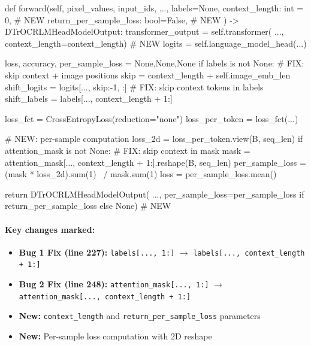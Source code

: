 \documentclass[11pt, a4paper]{report}
\begin{document}
\begin{minipage}[t]{0.48\textwidth}
\begin{newcode}
def forward(self, pixel_values, input_ids,
    ..., labels=None,
    context_length: int = 0,           # NEW
    return_per_sample_loss: bool=False, # NEW
) -> DTrOCRLMHeadModelOutput:
    transformer_output = self.transformer(
      ..., context_length=context_length) # NEW
    logits = self.language_model_head(...)

    loss, accuracy, per_sample_loss = None,None,None
    if labels is not None:
      # FIX: skip context + image positions
      skip = context_length + self.image_emb_len
      shift_logits = logits[..., skip:-1, :]
      # FIX: skip context tokens in labels
      shift_labels = labels[...,
        context_length + 1:]

      loss_fct = CrossEntropyLoss(reduction="none")
      loss_per_token = loss_fct(...)

      # NEW: per-sample computation
      loss_2d = loss_per_token.view(B, seq_len)
      if attention_mask is not None:
        # FIX: skip context in mask
        mask = attention_mask[...,
          context_length + 1:].reshape(B, seq_len)
        per_sample_loss = (mask * loss_2d).sum(1) \
                        / mask.sum(1)
        loss = per_sample_loss.mean()

    return DTrOCRLMHeadModelOutput(
      ..., per_sample_loss=per_sample_loss
      if return_per_sample_loss else None)  # NEW
\end{newcode}
\end{minipage}

\paragraph{Key changes marked:}
\begin{itemize}[leftmargin=2em]
  \item \textbf{Bug 1 Fix (line 227):} \texttt{labels[..., 1:]} $\to$ \texttt{labels[..., context\_length + 1:]}
  \item \textbf{Bug 2 Fix (line 248):} \texttt{attention\_mask[..., 1:]} $\to$ \texttt{attention\_mask[..., context\_length + 1:]}
  \item \textbf{New:} \texttt{context\_length} and \texttt{return\_per\_sample\_loss} parameters
  \item \textbf{New:} Per-sample loss computation with 2D reshape
\end{itemize}
\end{document}
